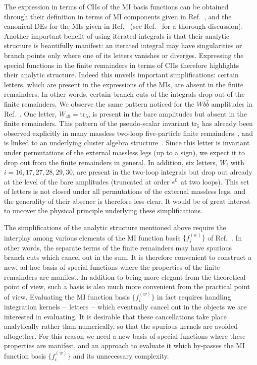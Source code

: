 \documentclass[main.tex]{subfiles}
\begin{document}
The expression in terms of CIIs of the MI basis functions can be obtained through their definition in terms of MI components given in Ref.~\cite{Badger:2021nhg}, and the canonical DEs for the MIs given in Ref.~\cite{Abreu:2020jxa} (see Ref.~\cite{Badger:2021nhg} for a thorough discussion). Another important benefit of using iterated integrals is that their analytic structure is beautifully manifest: an iterated integral may have singularities or branch points only where one of its letters vanishes or diverges. Expressing the special functions in the finite remainders in terms of CIIs therefore highlights their analytic structure. Indeed this unveils important simplifications: certain letters, which are present in the expressions of the MIs, are absent in the finite remainders. In other words, certain branch cuts of the integrals drop out of the finite remainders. We observe the same pattern noticed for the $Wb\bar{b}$ amplitudes in Ref.~\cite{Badger:2021nhg}. One letter, $W_{49} = \text{tr}_5$, is present in the bare amplitudes but absent in the finite remainders. This pattern of the pseudo-scalar invariant $\text{tr}_5$ has already been observed explicitly in many massless two-loop five-particle finite remainders~\cite{Badger:2018enw,Abreu:2018zmy,Abreu:2018aqd,Chicherin:2018yne,Chicherin:2019xeg,Abreu:2019rpt,Abreu:2019odu,Badger:2019djh,Caron-Huot:2020vlo,Abreu:2020cwb,Chawdhry:2020for}, and is linked to an underlying cluster algebra structure~\cite{Chicherin:2020umh}. Since this letter is invariant under permutations of the external massless legs (up to a sign), we expect it to drop out from the finite remainders in general.
In addition, six letters, $W_i$ with $i=16,17,27,28,29,30$, are present in the two-loop integrals but drop out already at the level of the bare amplitudes (truncated at order $\epsilon^0$ at two loops). This set of letters is not closed under all permutations of the external massless legs, and the generality of their absence is therefore less clear.
It would be of great interest to uncover the physical principle underlying these simplifications.

The simplifications of the analytic structure mentioned above require the interplay among various elements of the MI function basis $\{f^{(w)}_i\}$ of Ref.~\cite{Badger:2021nhg}. In other words, the separate terms of the finite remainders may have spurious branch cuts which cancel out in the sum. It is therefore convenient to construct a new, ad hoc basis of special functions where the properties of the finite remainders are manifest. In addition to being more elegant from the theoretical point of view, such a basis is also much more convenient from the practical point of view. Evaluating the MI function basis $\{f^{(w)}_i\}$ in fact requires handling integration kernels --~letters~-- which eventually cancel out in the objects we are interested in evaluating. It is desirable that these cancellations take place analytically rather than numerically, so that the spurious kernels are avoided altogether. For this reason we need a new basis of special functions where these properties are manifest, and an approach to evaluate it which by-passes the MI function basis $\{f^{(w)}_i\}$ and its unnecessary complexity.
\end{document}
